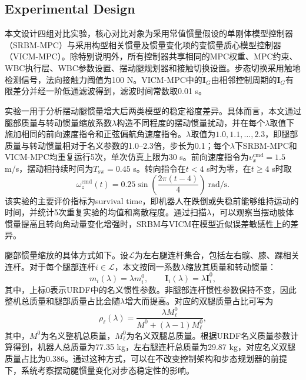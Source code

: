 ﻿\documentclass[preprint,12pt]{elsarticle}
\begin{document}
\subsection{Experimental Design}
本文设计四组对比实验，核心对比对象为采用常值惯量假设的单刚体模型控制器（SRBM-MPC）与采用构型相关惯量及惯量变化项的变惯量质心模型控制器（VICM-MPC）。除特别说明外，所有控制器共享相同的MPC权重、MPC约束、WBC执行层、WBC参数设置、摆动腿规划器和接触切换设置。步态切换采用触地检测信号，法向接触力阈值为100 N。VICM-MPC中的$\dot{\bm I}_G$由相邻控制周期的$\bm I_G$有限差分并经一阶低通滤波得到，滤波时间常数取0.01 s。

实验一用于分析摆动腿惯量增大后两类模型的稳定裕度差异。具体而言，本文通过腿部质量与转动惯量缩放系数$\lambda$构造不同程度的摆动惯量扰动，并在每个$\lambda$取值下施加相同的前向速度指令和正弦偏航角速度指令。$\lambda$取值为$1.0,1.1,\ldots,2.3$，即腿部质量与转动惯量相对于名义参数的1.0--2.3倍，步长为0.1；每个$\lambda$下SRBM-MPC和VICM-MPC均重复运行5次，单次仿真上限为30 s。前向速度指令为$v_x^{\mathrm{cmd}}=1.5$ m/s，摆动相持续时间为$T_{\mathrm{sw}}=0.45$ s。转向指令在$t<4$ s时为零，在$t\ge4$ s时取
\begin{equation}
\omega_z^{\mathrm{cmd}}(t)=0.25\sin\left(\frac{2\pi(t-4)}{4}\right)\ \mathrm{rad/s}.
\label{eq:exp_sine_wz}
\end{equation}
该实验的主要评价指标为survival time，即机器人在跌倒或失稳前能够维持运动的时间，并统计5次重复实验的均值和离散程度。通过扫描$\lambda$，可以观察当摆动肢体惯量提高且转向角动量变化增强时，SRBM与VICM在模型近似误差敏感性上的差异。

腿部惯量缩放的具体方式如下。设$\mathcal{L}$为左右腿连杆集合，包括左右髋、膝、踝相关连杆。对于每个腿部连杆$i\in\mathcal{L}$，本文按同一系数$\lambda$缩放其质量和转动惯量：
\begin{equation}
m_i(\lambda)=\lambda m_i^0,\qquad
\bm I_i(\lambda)=\lambda \bm I_i^0 ,
\label{eq:leg_lambda_scaling}
\end{equation}
其中，上标0表示URDF中的名义惯性参数。非腿部连杆惯性参数保持不变，因此整机总质量和腿部质量占比会随$\lambda$增大而提高。对应的双腿质量占比可写为
\begin{equation}
\rho_\ell(\lambda)=
\frac{\lambda M_\ell^0}{M^0+(\lambda-1)M_\ell^0},
\label{eq:leg_mass_fraction_lambda}
\end{equation}
其中，$M^0$为名义整机总质量，$M_\ell^0$为名义双腿总质量。根据URDF名义质量参数计算得到，机器人总质量为77.35 kg，左右腿连杆总质量为29.87 kg，对应名义双腿质量占比为0.386。通过这种方式，可以在不改变控制架构和步态规划器的前提下，系统考察摆动腿惯量变化对步态稳定性的影响。
\end{document}
